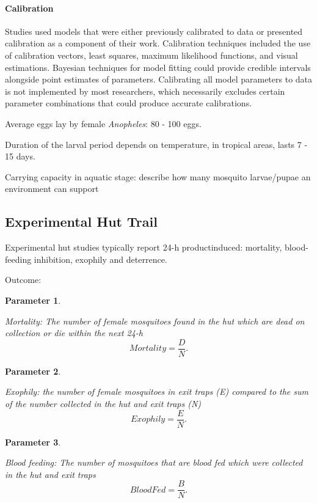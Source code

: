 \documentclass[a4paper, 12pt, twoside]{article}
\newtheorem{parameter}{Parameter}
\begin{document}
\paragraph{Calibration}%
\label{par:calibration}
Studies used models that were either previously calibrated to data or presented calibration as a component of their work.
Calibration techniques included the use of calibration vectors, least squares, maximum likelihood functions, and visual estimations.
Bayesian techniques for model fitting could provide credible intervals alongside point estimates of parameters.
Calibrating all model parameters to data is not implemented by most researchers, which necessarily excludes certain parameter combinations that could produce accurate calibrations.

Average eggs lay by female \textit{Anopheles}: 80 - 100 eggs.

Duration of the larval period depends on temperature, in tropical areas, lasts 7 - 15 days.\cite{bayoh_lindsay_2003}

Carrying capacity in aquatic stage: describe how many mosquito larvae/pupae an environment can support

\subsection{Experimental Hut Trail}
Experimental hut studies typically report 24-h productinduced: mortality, blood-feeding inhibition, exophily and deterrence.

Outcome:

\begin{parameter}
	\label{eht:mortality}

	Mortality: The number of female mosquitoes found in the hut which are dead on collection or die within the next 24-h
	\[
		Mortality = \frac{D}{N}
		.\]
\end{parameter}


\begin{parameter}
	\label{eht:exophily}

	Exophily: the number of female mosquitoes in exit traps (E) compared to the sum of the number collected in the hut and exit traps (N)
	\[
		Exophily = \frac{E}{N}
		.\]

\end{parameter}

\begin{parameter}
	\label{eht:blood_fed}

	Blood feeding: The number of mosquitoes that are blood fed which were collected in the hut and exit traps
	\[
		BloodFed = \frac{B}{N}
		.\]
\end{parameter}
\end{document}
